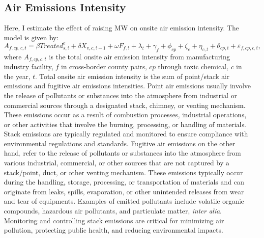 \documentclass[12pt, english]{article}
\begin{document}
    \subsection{Air Emissions Intensity}\label{subsec:air-emission-intensity}
    Here, I estimate the effect of raising MW on onsite air emission intensity. The model is given by:
    \begin{equation}
        A_{f,cp,c,t} = \beta Treated_{s,t}^e + \delta X_{v,c,t-1} + \omega F_{f,t} + \lambda_{t} + \gamma_{f} + \phi_{cp} + \zeta_{c} + \eta_{c,t} + \theta_{cp,t} + \varepsilon_{f,cp,c,t},\label{eq:baseline-onsite-air-emission-intensity}
    \end{equation}
    where $A_{f,cp,c,t}$ is the total onsite air emission intensity from manufacturing industry facility, $f$ in cross-border county pairs, $cp$ through toxic chemical, $c$ in the year, $t$. Total onsite air emission intensity is the sum of point/stack air emissions and fugitive air emissions intensities. Point air emissions usually involve the release of pollutants or substances into the atmosphere from industrial or commercial sources through a designated stack, chimney, or venting mechanism. These emissions occur as a result of combustion processes, industrial operations, or other activities that involve the burning, processing, or handling of materials. Stack emissions are typically regulated and monitored to ensure compliance with environmental regulations and standards. Fugitive air emissions on the other hand, refer to the release of pollutants or substances into the atmosphere from various industrial, commercial, or other sources that are not captured by a stack/point, duct, or other venting mechanism. These emissions typically occur during the handling, storage, processing, or transportation of materials and can originate from leaks, spills, evaporation, or other unintended releases from wear and tear of equipments. Examples of emitted pollutants include volatile organic compounds, hazardous air pollutants, and particulate matter, \textit{inter alia}. Monitoring and controlling stack emissions are critical for minimizing air pollution, protecting public health, and reducing environmental impacts.
    
\end{document}
